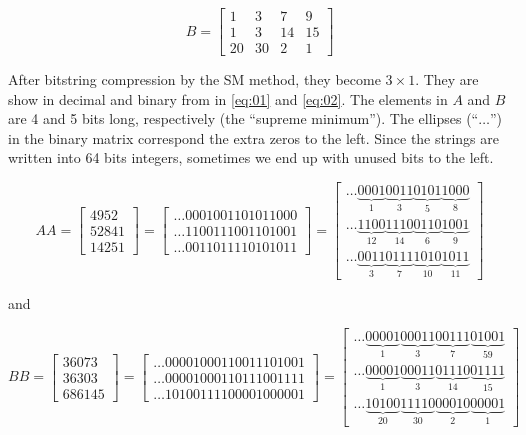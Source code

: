 \documentclass[12pt]{article}
\begin{document}
\begin{equation}
	B = \begin{bmatrix}
			1  & 3  & 7 & 9\\ 
			1  &3   & 14 & 15\\ 
			20 & 30 & 2 & 1
		\end{bmatrix}
\end{equation}

After bitstring compression by the SM method, they become $3 \times 1$. They
are show in decimal and binary from in \ref{eq:01} and
\ref{eq:02}. The elements in $A$ and $B$ are 4 and 5 bits long, respectively
(the ``supreme minimum''). The ellipses (``$\ldots$'') in the binary matrix
correspond the extra zeros to the left. Since the strings are written into 64
bits integers, sometimes we end up with unused bits to the left.

\begin{equation}\label{eq:01}
	AA = \begin{bmatrix}
			4952\\ 
			52841\\ 
			14251
		\end{bmatrix} 
        =
        \begin{bmatrix}
			\ldots0001001101011000\\ 
			\ldots1100111001101001\\ 
			\ldots0011011110101011
		\end{bmatrix}
        =
        \begin{bmatrix}
\ldots\underbrace{0001}_{1}\underbrace{0011}_{3}\underbrace{0101}_{5}\underbrace
{1000}_{8}\\
\ldots\underbrace{1100}_{12}\underbrace{1110}_{14}\underbrace{0110}_{6}
\underbrace{1001}_{9}\\ 
\ldots\underbrace{0011}_{3}\underbrace{0111}_{7}\underbrace{1010}_{10}
\underbrace{1011}_{11}
	\end{bmatrix}
\end{equation}

and

\begin{equation}\label{eq:02}
	BB = \begin{bmatrix}
			36073\\ 
			36303\\ 
			686145
		\end{bmatrix}
        =
         \begin{bmatrix}
			\ldots00001000110011101001\\ 
			\ldots00001000110111001111\\ 
			\ldots10100111100001000001
		\end{bmatrix}
        =
        \begin{bmatrix}

\ldots\underbrace{00001}_{1}\underbrace{00011}_{3}\underbrace{00111}_{7}
\underbrace{01001}_{59}\\
\ldots\underbrace{00001}_{1}\underbrace{00011}_{3}\underbrace{01110}_{14}
\underbrace{01111}_{15}\\
\ldots\underbrace{10100}_{20}\underbrace{11110}_{30}\underbrace{00010}_{2}
\underbrace{00001}_{1}
		\end{bmatrix}
\end{equation}
\end{document}
